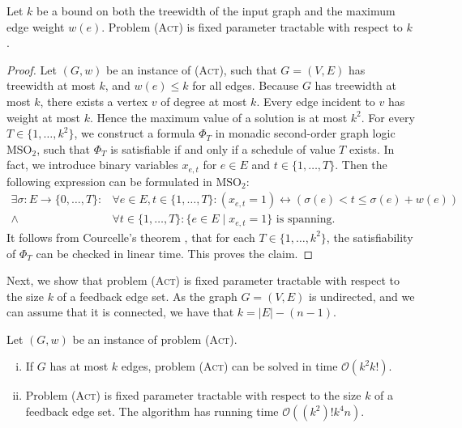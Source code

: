\documentclass[runningheads]{llncs}
\numberwithin{equation}{section}
\newcommand{\set}[1]{\{ #1 \}}
\newcommand{\fromto}[2]{\set{#1, \ldots, #2}}
\newcommand{\bigO}{\mathcal{O}}
\newcommand{\act}{\textsc{(Act)}}
\begin{document}
\begin{theorem}
Let $k$ be a bound on both the treewidth of the input graph and the maximum edge weight $w(e)$. Problem {\act} is fixed parameter tractable with respect to $k$.
\end{theorem}
\begin{proof}
Let $(G, w)$ be an instance of {\act}, such that $G = (V, E)$ has treewidth at most $k$, and $w(e) \leq k$ for all edges. Because $G$ has treewidth at most $k$, there exists a vertex $v$ of degree at most $k$. Every edge incident to $v$ has weight at most $k$. Hence the maximum value of a solution is at most $k^2$. For every $T \in \{1,\dots,k^2\}$, we construct a formula $\Phi_T$ in monadic second-order graph logic $\text{MSO}_2$, such that $\Phi_T$ is satisfiable if and only if a schedule of value $T$ exists. In fact, we introduce binary variables $x_{e,t}$ for $e \in E$ and $t \in \{1,\dots,T\}$. Then the following expression can be formulated in $\text{MSO}_2$:
\begin{align*}
\exists \sigma :  E \rightarrow \fromto{0}{T} : &\forall e \in E, t \in \{1, \dots, T\}: (x_{e,t}=1) \leftrightarrow \left(\sigma(e) < t \leq \sigma(e) + w(e)\right)\\
\land &\forall t \in \{1, \dots, T\}: \set{e \in E \mid x_{e,t} = 1} \text{ is spanning.}
\end{align*}
It follows from Courcelle's theorem \cite{courcelle1990monadic}, that for each $T \in \{1,\dots,k^2\}$, the satisfiability of $\Phi_T$ can be checked in linear time. This proves the claim.
\end{proof}

Next, we show that problem {\act} is fixed parameter tractable with respect to the size $k$ of a feedback edge set. As the graph $G = (V,E)$ is undirected, and we can assume that it is connected, we have that $k = |E| - (n - 1)$.

\begin{theorem}
\label{thm:FPT_feedback_edge_set}
Let $(G, w)$ be an instance of problem {\act}.
\begin{enumerate}[(i)]
\item If $G$ has at most $k$ edges, problem {\act} can be solved in time $\bigO(k^2k!)$.
\item Problem {\act} is fixed parameter tractable with respect to the size $k$ of a feedback edge set. The algorithm has running time $\bigO((k^2)!k^4n)$. 

\end{enumerate}
\end{theorem}
\end{document}
